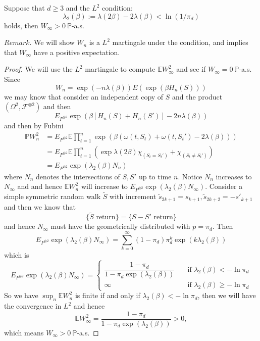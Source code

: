 \begin{theorem}
    Suppose that $d\geq 3$ and the $L^2$ condition:
    \[
    \lambda_2(\beta) := \lambda(2\beta) - 2\lambda(\beta) < \ln(1/\pi_d)
    \]
    holds, then $W_{\infty} >0\ \mathbb{P}$-a.s.
\end{theorem}
$Remark$. We will show $W_n$ is a $L^2$ martingale under the condition, and implies that $W_{\infty}$ have a positive expectation.
\begin{proof}
    We will use the $L^2$ martingale to compute $\mathbb{E} W_{\infty}^2$ and see if $W_{\infty} = 0\ \mathbb{P}$-a.s. Since
    \[
    W_n = \exp{(-n\lambda(\beta))}E(\exp{(\beta H_n(S))})
    \] 
    we may know that consider an independent copy of $S$ and the product $(\Omega^2, \mathcal{F}^{\otimes 2})$ and then
    \[
    E_{P^{\otimes 2}}\exp{\left(\beta\left[H_n(S) + H_n(S')\right]-2n\lambda(\beta)\right)}
    \]
    and then by Fubini
    \[
    \begin{aligned}
    \mathbb{P}W_n^2 &= E_{P^{\otimes 2}} \mathbb{E} \prod_{t=1}^n \exp{\left( \beta(\omega(t,S_t)+\omega(t,S_t')-2\lambda(\beta))\right)} \\
    &= E_{P^{\otimes 2}} \mathbb{E} \prod_{t=1}^n \left(\exp{\lambda(2\beta)}\chi_{(S_t = S_t')} + \chi_{(S_t \neq S_t')}\right) \\
    &= E_{P^{\otimes 2}} \exp{\left(\lambda_2(\beta) N_n\right)}
    \end{aligned}
    \]
    where $N_n$ denotes the intersections of $S,S'$ up to time $n$. Notice $N_n$ increases to $N_{\infty}$ and and hence $\mathbb{E}W_n^2$ will increase to $E_{P^{\otimes 2}} \exp{\left(\lambda_2(\beta) N_{\infty}\right)}$. Consider a simple symmetric random walk $\tilde{S}$ with increment $\tilde{s}_{2k+1} = s_{k+1}, \tilde{s}_{2k+2} = -s'_{k+1}$ and then we know that
    \[
    \{\tilde{S}\text{ return}\} = \{S-S'\text{ return}\}
    \]
    and hence $N_{\infty}$ must have the geometrically distributed with $p = \pi_d$. Then
    \[
    E_{P^{\otimes 2}} \exp{\left(\lambda_2(\beta) N_{\infty}\right)} = \sum\limits_{k=0}^{\infty}(1-\pi_d)\pi_d^k \exp{(k\lambda_2(\beta))}
    \]
    which is
    \[E_{P^{\otimes 2}} \exp{\left(\lambda_2(\beta) N_{\infty}\right)}  =
    \begin{cases}
        \dfrac{1-\pi_d}{1-\pi_d\exp{(\lambda_2(\beta))}}\quad&\text{if }\lambda_2(\beta) < -\ln \pi_d \\
        \infty&\text{if }\lambda_2(\beta) \geq -\ln \pi_d
    \end{cases}
    \]
    So we have $\sup_n \mathbb{E}W_n^2$ is finite if and only if $\lambda_2(\beta) < -\ln \pi_d$, then we will have the convergence in $L^2$ and hence \[\mathbb{E} W_{\infty}^2 = \dfrac{1-\pi_d}{1-\pi_d\exp(\lambda_2(\beta))} > 0,\] which means $W_{\infty} > 0\ \mathbb{P}$-a.s.
\end{proof}

